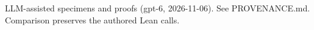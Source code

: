 \documentclass[11pt]{article}
\begin{document}

\bigskip
{\footnotesize LLM-assisted specimens and proofs (gpt-6, 2026-11-06).
See PROVENANCE.md. Comparison preserves the authored Lean calls.}
\end{document}
